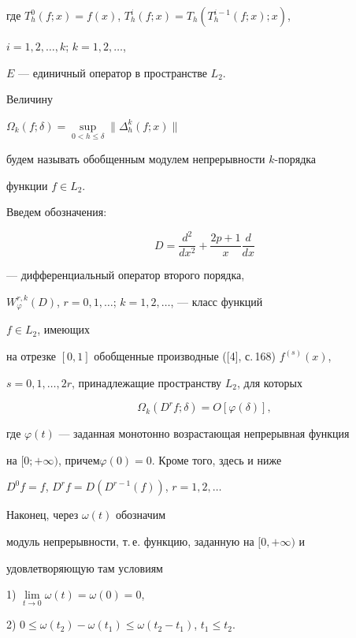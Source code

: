 где $T^0_h(f;x)=f(x)$, $T^i_h(f;x)=T_h(T^{i-1}_h(f;x);x)$, 


$i=1,2,\dotsc,k$; $k=1,2,\dotsc$, 


$E$ --- единичный оператор в пространстве $L_2$. 


 


Величину 


$\Omega_k(f;\delta)=\sup\limits_{0<h\le\delta} 


\|\Delta^k_h(f;x)\|$ 


будем называть обобщенным модулем непрерывности $k$-порядка 


функции $f\in L_2$. 


Введем обозначения: 


$$ 


D=\frac{d^2}{dx^2}+\frac{2p+1}{x}\frac{d}{dx} 


$$ 


--- дифференциальный оператор второго порядка, 


$W^{r,k}_\varphi(D)$, $r=0,1,\dotsc$; $k=1,2,\dotsc$, --- класс функций 


$f\in L_2$, имеющих 


на отрезке $[0,1]$ обобщенные производные ([4], с.\,168) $f^{(s)}(x)$, 


$s=0,1,\dotsc,2r$, принадлежащие пространству $L_2$, для которых 


$$ 


\Omega_k(D^r f;\delta)=O[\varphi(\delta)], 


$$ 


где $\varphi(t)$ --- заданная монотонно возрастающая непрерывная функция 


на $[0;+\infty)$, причем\linebreak $\varphi(0)=0$. Кроме того, здесь и ниже 


$D^0f=f$, $D^r f=D(D^{r-1}(f))$, $r=1,2,\dotsc$ 


Наконец, через $\omega(t)$ обозначим 


модуль непрерывности, т.\,е. функцию, заданную на $[0,+\infty)$ и 


удовлетворяющую там условиям


 


1) $\lim\limits_{t\to0}\omega(t)=\omega(0)=0$, 


 


2) $0\le\omega(t_2)-\omega(t_1)\le\omega(t_2-t_1)$, $t_1\le t_2$. 


